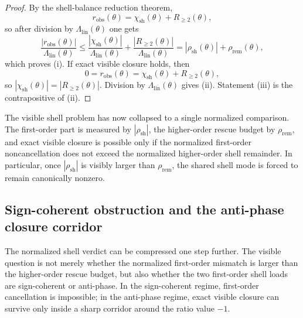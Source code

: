 \begin{proof}
By the shell-balance reduction theorem,
\[
  r_{\mathrm{obs}}(\theta)=\chi_{\mathrm{sh}}(\theta)+R_{\ge 2}(\theta),
\]
so after division by $\Lambda_{\mathrm{lin}}(\theta)$ one gets
\[
  \frac{|r_{\mathrm{obs}}(\theta)|}{\Lambda_{\mathrm{lin}}(\theta)}
  \le \frac{|\chi_{\mathrm{sh}}(\theta)|}{\Lambda_{\mathrm{lin}}(\theta)}+\frac{|R_{\ge 2}(\theta)|}{\Lambda_{\mathrm{lin}}(\theta)}
  =|\rho_{\mathrm{sh}}(\theta)|+\rho_{\mathrm{rem}}(\theta),
\]
which proves (i). If exact visible closure holds, then
\[
  0=r_{\mathrm{obs}}(\theta)=\chi_{\mathrm{sh}}(\theta)+R_{\ge 2}(\theta),
\]
so $|\chi_{\mathrm{sh}}(\theta)|=|R_{\ge 2}(\theta)|$. Division by $\Lambda_{\mathrm{lin}}(\theta)$ gives (ii). Statement (iii) is the contrapositive of (ii).
\end{proof}

\begin{remark}
The visible shell problem has now collapsed to a single normalized comparison. The first-order part is measured by $|\rho_{\mathrm{sh}}|$, the higher-order rescue budget by $\rho_{\mathrm{rem}}$, and exact visible closure is possible only if the normalized first-order noncancellation does not exceed the normalized higher-order shell remainder. In particular, once $|\rho_{\mathrm{sh}}|$ is visibly larger than $\rho_{\mathrm{rem}}$, the shared shell mode is forced to remain canonically nonzero.
\end{remark}


\subsection*{Sign-coherent obstruction and the anti-phase closure corridor}
The normalized shell verdict can be compressed one step further. The visible question is not merely whether the normalized first-order mismatch is larger than the higher-order rescue budget, but also whether the two first-order shell loads are sign-coherent or anti-phase. In the sign-coherent regime, first-order cancellation is impossible; in the anti-phase regime, exact visible closure can survive only inside a sharp corridor around the ratio value $-1$.

